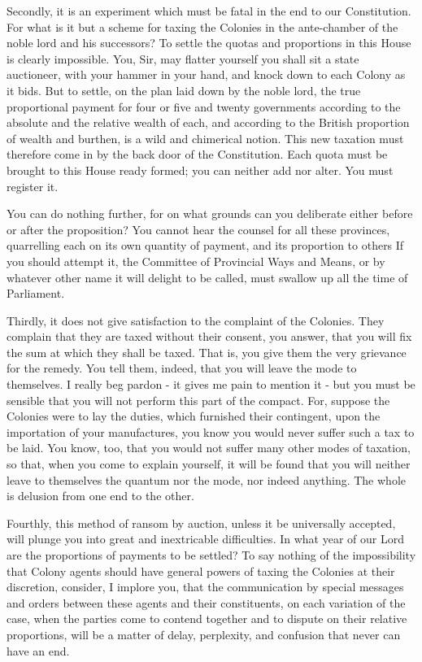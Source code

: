Secondly, it is an experiment which must be fatal in the end to our Constitution. For what is it but a scheme for taxing the Colonies in the ante-chamber of the noble lord and his successors? To settle the quotas and proportions in this House is clearly impossible. You, Sir, may flatter yourself you shall sit a state auctioneer, with your hammer in your hand, and knock down to each Colony as it bids. But to settle, on the plan laid down by the noble lord, the true proportional payment for four or five and twenty governments according to the absolute and the relative wealth of each, and according to the British proportion of wealth and burthen, is a wild and chimerical notion. This new taxation must therefore come in by the back door of the Constitution. Each quota must be brought to this House ready formed; you can neither add nor alter. You must register it.\par

You can do nothing further, for on what grounds can you deliberate either before or after the proposition? You cannot hear the counsel for all these provinces, quarrelling each on its own quantity of payment, and its proportion to others If you should attempt it, the Committee of Provincial Ways and Means, or by whatever other name it will delight to be called, must swallow up all the time of Parliament.\par

Thirdly, it does not give satisfaction to the complaint of the Colonies. They complain that they are taxed without their consent, you answer, that you will fix the sum at which they shall be taxed. That is, you give them the very grievance for the remedy. You tell them, indeed, that you will leave the mode to themselves. I really beg pardon - it gives me pain to mention it - but you must be sensible that you will not perform this part of the compact. For, suppose the Colonies were to lay the duties, which furnished their contingent, upon the importation of your manufactures, you know you would never suffer such a tax to be laid. You know, too, that you would not suffer many other modes of taxation, so that, when you come to explain yourself, it will be found that you will neither leave to themselves the quantum nor the mode, nor indeed anything. The whole is delusion from one end to the other.\par

Fourthly, this method of ransom by auction, unless it be universally accepted, will plunge you into great and inextricable difficulties. In what year of our Lord are the proportions of payments to be settled? To say nothing of the impossibility that Colony agents should have general powers of taxing the Colonies at their discretion, consider, I implore you, that the communication by special messages and orders between these agents and their constituents, on each variation of the case, when the parties come to contend together and to dispute on their relative proportions, will be a matter of delay, perplexity, and confusion that never can have an end.\par

